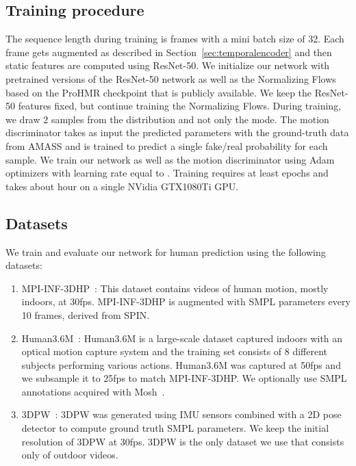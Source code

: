 \documentclass[runningheads]{llncs}
\begin{document}
\subsection{Training procedure}
The sequence length during training is  frames with a mini batch size of 32. Each frame gets augmented as described in Section~\ref{sec:temporalencoder} and then static features are computed using ResNet-50. We initialize our network with pretrained versions of the ResNet-50 network as well as the Normalizing Flows based on the ProHMR checkpoint that is publicly available. We keep the ResNet-50 features fixed, but continue training the Normalizing Flows. During training, we draw 2 samples from the distribution and not only the mode. The motion discriminator takes as input the predicted parameters   with the ground-truth data from AMASS and is trained to predict a single fake/real probability for each sample. We train our network as well as the motion discriminator using Adam optimizers with learning rate equal to .
Training requires at least  epochs and takes about  hour on a single NVidia GTX1080Ti GPU.



\subsection {Datasets}

We train and evaluate our network for human prediction using the following datasets:
\begin{enumerate}
    \item MPI-INF-3DHP~\cite{mono-3dhp2017}: This dataset contains videos of human motion, mostly indoors, at 30fps. MPI-INF-3DHP is augmented with SMPL parameters every 10 frames, derived from SPIN. 
    \item Human3.6M~\cite{h36m_pami,IonescuSminchisescu11}: Human3.6M is a large-scale dataset captured indoors with an optical motion capture system and the training set consists of 8 different subjects performing various actions. Human3.6M was captured at 50fps and we subsample it to 25fps to match MPI-INF-3DHP. We optionally use SMPL annotations acquired with Mosh~\cite{Loper:SIGASIA:2014}.
    \item 3DPW~\cite{vonMarcard2018}: 3DPW was generated using IMU sensors combined with a 2D pose detector to compute ground truth SMPL parameters. We keep the initial resolution of 3DPW at 30fps. 3DPW is the only dataset we use that consists only of outdoor videos.
\end{enumerate}
\end{document}
